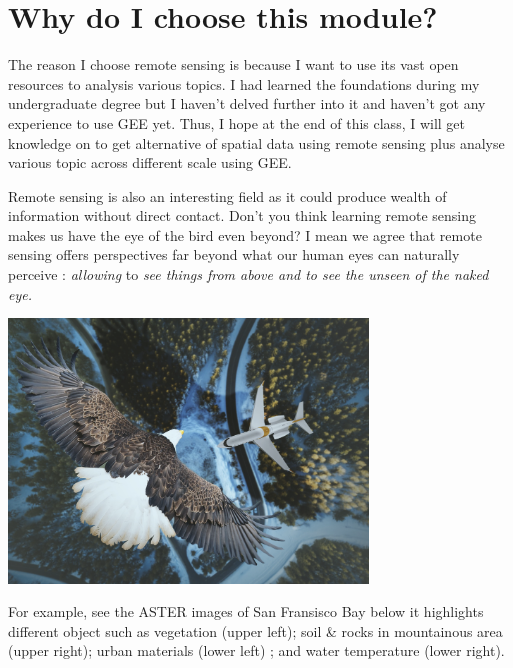 \documentclass[
  letterpaper,
  DIV=11,
  numbers=noendperiod]{scrreprt}
\begin{document}
\hypertarget{why-do-i-choose-this-module}{%
\section{Why do I choose this
module?}\label{why-do-i-choose-this-module}}

The reason I choose remote sensing is because I want to use its vast
open resources to analysis various topics. I had learned the foundations
during my undergraduate degree but I haven't delved further into it and
haven't got any experience to use GEE yet. Thus, I hope at the end of
this class, I will get knowledge on to get alternative of spatial data
using remote sensing plus analyse various topic across different scale
using GEE.

Remote sensing is also an interesting field as it could produce wealth
of information without direct contact. Don't you think learning remote
sensing makes us have the eye of the bird even beyond? I mean we agree
that remote sensing offers perspectives far beyond what our human eyes
can naturally perceive : \emph{allowing} to \emph{see things from above
and to see the unseen of the naked eye.}

\includegraphics[width=3.76042in,height=\textheight]{images/clipboard-2217286199.png}

For example, see the ASTER images of San Fransisco Bay below it
highlights different object such as vegetation (upper left); soil \&
rocks in mountainous area (upper right); urban materials (lower left) ;
and water temperature (lower right).
\end{document}
